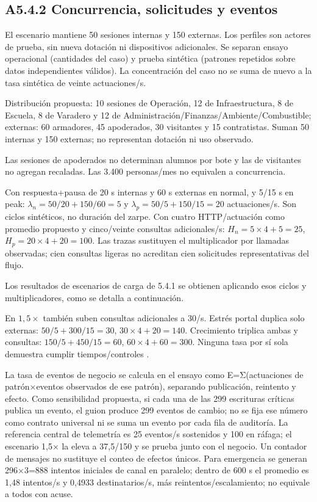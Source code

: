 \subsection*{A5.4.2 Concurrencia, solicitudes y eventos}

El escenario mantiene 50 sesiones internas y 150 externas. Los perfiles son actores de prueba, sin nueva dotación ni dispositivos adicionales. Se separan ensayo operacional (cantidades del caso) y prueba sintética (patrones repetidos sobre datos independientes válidos). La concentración del caso no se suma de nuevo a la tasa sintética de veinte actuaciones/s.


Distribución propuesta: 10 sesiones de Operación, 12 de Infraestructura, 8 de Escuela, 8 de Varadero y 12 de Administración/Finanzas/Ambiente/Combustible; externas: 60 armadores, 45 apoderados, 30 visitantes y 15 contratistas. Suman 50 internas y 150 externas; no representan dotación ni uso observado.


Las sesiones de apoderados no determinan alumnos por bote y las de visitantes no agregan recaladas. Las 3.400 personas/mes no equivalen a concurrencia.

Con respuesta+pausa de 20 s internas y 60 s externas en normal, y 5/15 s en peak: \(\lambda_n=50/20+150/60=5\) y \(\lambda_p=50/5+150/15=20\) actuaciones/s. Son ciclos sintéticos, no duración del zarpe. Con cuatro HTTP/actuación como promedio propuesto y cinco/veinte consultas adicionales/s: \(H_n=5\times4+5=25\), \(H_p=20\times4+20=100\). Las trazas sustituyen el multiplicador por llamadas observadas; cien consultas ligeras no acreditan cien solicitudes representativas del flujo.

Los resultados de escenarios de carga de 5.4.1 se obtienen aplicando esos ciclos y multiplicadores, como se detalla a continuación.


En \(1{,}5\times\) también suben consultas adicionales a 30/s. Estrés portal duplica solo externas: \(50/5+300/15=30\), \(30\times4+20=140\). Crecimiento triplica ambas y consultas: \(150/5+450/15=60\), \(60\times4+60=300\). Ninguna tasa por sí sola demuestra cumplir tiempos/controles \parencite[RT-09.03 y RT-09.06]{pucv-bases-transversales}.

La tasa de eventos de negocio se calcula en el ensayo como E=Σ(actuaciones de patrón×eventos observados de ese patrón), separando publicación, reintento y efecto. Como sensibilidad propuesta, si cada una de las 299 escrituras críticas publica un evento, el guion produce 299 eventos de cambio; no se fija ese número como contrato universal ni se suma un evento por cada fila de auditoría. La referencia central de telemetría es 25 eventos/s sostenidos y 100 en ráfaga; el escenario 1,5× la eleva a 37,5/150 y se prueba junto con el negocio. Un contador de mensajes no sustituye el conteo de efectos únicos. Para emergencia se generan 296×3=888 intentos iniciales de canal en paralelo; dentro de 600 s el promedio es 1,48 intentos/s y 0,4933 destinatarios/s, más reintentos/escalamiento; no equivale a todos con acuse.

